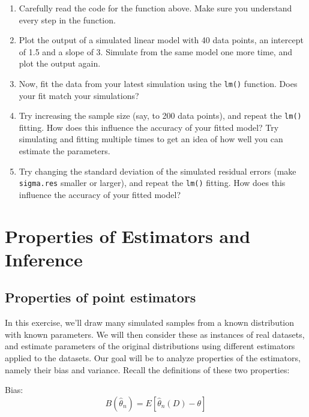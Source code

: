 \documentclass[
]{book}
\providecommand{\tightlist}{%
  \setlength{\itemsep}{0pt}\setlength{\parskip}{0pt}}
\begin{document}
\begin{enumerate}
\def\labelenumi{\alph{enumi})}
\tightlist
\item
  Carefully read the code for the function above. Make sure you understand every step in the function.\\
\item
  Plot the output of a simulated linear model with 40 data points, an intercept of 1.5 and a slope of 3. Simulate from the same model one more time, and plot the output again.\\
\item
  Now, fit the data from your latest simulation using the \texttt{lm()} function. Does your fit match your simulations?\\
\item
  Try increasing the sample size (say, to 200 data points), and repeat the \texttt{lm()} fitting. How does this influence the accuracy of your fitted model? Try simulating and fitting multiple times to get an idea of how well you can estimate the parameters.\\
\item
  Try changing the standard deviation of the simulated residual errors (make \texttt{sigma.res} smaller or larger), and repeat the \texttt{lm()} fitting. How does this influence the accuracy of your fitted model?
\end{enumerate}

\hypertarget{properties-of-estimators-and-inference}{%
\chapter{Properties of Estimators and Inference}\label{properties-of-estimators-and-inference}}

\hypertarget{properties-of-point-estimators}{%
\section{Properties of point estimators}\label{properties-of-point-estimators}}

In this exercise, we'll draw many simulated samples from a known distribution with known parameters. We will then consider these as instances of real datasets, and estimate parameters of the original distributions using different estimators applied to the datasets. Our goal will be to analyze properties of the estimators, namely their bias and variance. Recall the definitions of these two properties:

Bias: \[B(\hat\theta_n) =  E[\hat\theta_n(D) - \theta] \]
\end{document}
